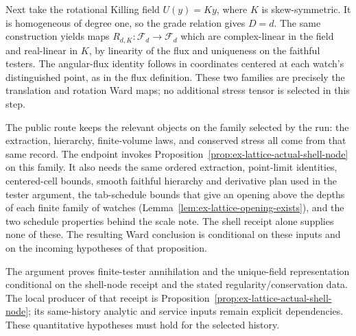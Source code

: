 Next take the rotational Killing field $U(y)=Ky$, where $K$ is skew-symmetric.
It is homogeneous of degree one, so the grade relation gives $D=d$.  The same
construction yields maps $R_{d,K}:\mathcal F_d\to\mathcal F_d$ which are
complex-linear in the field and real-linear in $K$, by linearity of the flux
and uniqueness on the faithful testers.  The angular-flux identity follows
in coordinates centered at each watch's distinguished point, as in the flux
definition.  These two families are precisely the translation
and rotation Ward maps; no additional stress tensor is selected in this
step.

\begin{remark}
\label{rem:ex-lattice-stress-public-binding}
The public route keeps the relevant objects on the family selected by the
run: the extraction, hierarchy, finite-volume laws, and conserved stress all
come from that same record.  The endpoint invokes Proposition~\ref{prop:ex-lattice-actual-shell-node}
on this family. It also needs the same ordered extraction, point-limit
identities, centered-cell bounds, smooth faithful hierarchy and derivative
plan used in the tester argument, the tab-schedule bounds that give an
opening above the depths of each finite family of watches
(Lemma~\ref{lem:ex-lattice-opening-exists}), and the two schedule
properties behind the scale note. The shell receipt alone supplies none of
these. The resulting Ward conclusion is conditional on these inputs
and on the incoming hypotheses of that proposition.
\end{remark}

The argument proves finite-tester annihilation and the unique-field
representation conditional on the shell-node receipt and the stated
regularity/conservation data.  The local producer of that receipt is
Proposition~\ref{prop:ex-lattice-actual-shell-node}; its same-history
analytic and service inputs remain explicit dependencies. These
quantitative hypotheses must hold for the selected history.

